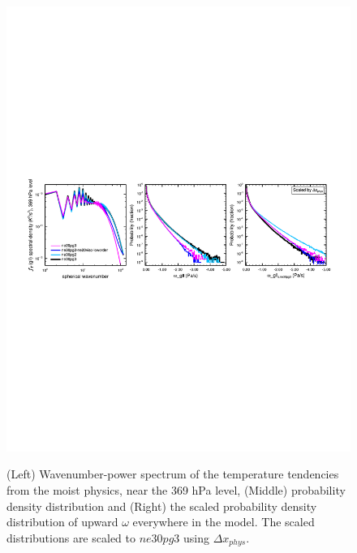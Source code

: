 \documentclass{agujournal}
\begin{document}
\begin{figure}[t]
\begin{center}
\noindent\includegraphics[width=30pc,angle=0]{figs/panel_ne20pg2-ne30pg2-ne30pg3.pdf}\\
\end{center}
\caption{(Left) Wavenumber-power spectrum of the temperature tendencies from the moist physics, near the 369 hPa level, (Middle) probability density distribution and (Right) the scaled probability density distribution of upward $\omega$ everywhere in the model. The scaled distributions are scaled to $ne30pg3$ using $\Delta x_{phys}$.}
\label{fig:pgXpanel-lores}
\end{figure}
\end{document}
